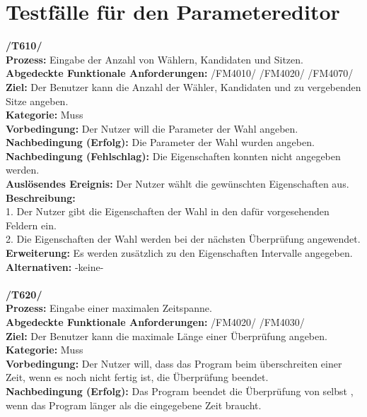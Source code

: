 \documentclass[a4paper]{scrreprt}
\begin{document}
\section{Testfälle für den Parametereditor}


\textbf{/T610/}\\
\textbf{Prozess: }Eingabe der Anzahl von Wählern, Kandidaten und Sitzen.\\
\textbf{Abgedeckte Funktionale Anforderungen:} /FM4010/ /FM4020/ /FM4070/ \\
\textbf{Ziel:} Der Benutzer kann die Anzahl der Wähler, Kandidaten und zu
vergebenden Sitze angeben. \\
\textbf{Kategorie:} Muss\\
\textbf{Vorbedingung:} Der Nutzer will die Parameter der Wahl angeben.\\
\textbf{Nachbedingung (Erfolg):} Die Parameter der Wahl wurden angeben.\\
\textbf{Nachbedingung (Fehlschlag):} Die Eigenschaften konnten nicht angegeben
werden.\\
\textbf{Auslösendes Ereignis:} Der Nutzer wählt die gewünschten Eigenschaften
aus.\\
\textbf{Beschreibung:} \\
1. Der Nutzer gibt die Eigenschaften der Wahl in den dafür vorgesehenden
Feldern ein.\\
2. Die Eigenschaften der Wahl werden bei der nächsten Überprüfung angewendet.\\
\textbf {Erweiterung:}  Es werden zusätzlich zu den Eigenschaften Intervalle
angegeben.\\
\textbf {Alternativen:} -keine- \\ \\
\textbf{/T620/}\\
\textbf{Prozess:} Eingabe einer maximalen Zeitspanne. \\
\textbf{Abgedeckte Funktionale Anforderungen:} /FM4020/ /FM4030/ \\
\textbf{Ziel:} Der Benutzer kann die maximale Länge einer Überprüfung angeben.\\
\textbf{Kategorie:} Muss\\
\textbf{Vorbedingung:} Der Nutzer will, dass das Program beim
überschreiten einer Zeit, wenn es noch nicht fertig ist, die Überprüfung
beendet.\\
\textbf{Nachbedingung (Erfolg):} Das Program beendet die Überprüfung von selbst
, wenn das Program länger als die eingegebene Zeit braucht.\\
\end{document}
